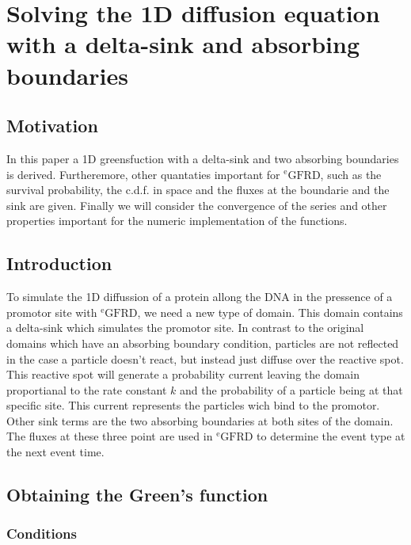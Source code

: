 \section{Solving the 1D diffusion equation with a delta-sink and absorbing boundaries}

\subsection{Motivation}

In this paper a 1D greensfuction with a delta-sink and two absorbing boundaries is derived. Furtheremore, other quantaties important for $^{\mathrm{e}} \mathrm{GFRD}$, such as the survival probability, the c.d.f. in space and the fluxes at the boundarie and the sink are given. Finally we will consider the convergence of the series and other properties important for the numeric implementation of the functions.

\subsection{Introduction}

To simulate the 1D diffussion of a protein allong the DNA in the pressence of a promotor site with $^{\mathrm{e}} \mathrm{GFRD}$, we need a new type of domain. This domain contains a delta-sink which simulates the promotor site. In contrast to the original domains which have an absorbing boundary condition, particles are not reflected in the case a particle doesn't react, but instead just diffuse over the reactive spot. This reactive spot will generate a probability current leaving the domain proportianal to the rate constant $k$ and the probability of a particle being at that specific site. This current represents the particles wich bind to the promotor. Other sink terms are the two absorbing boundaries at both sites of the domain. The fluxes at these three point are used in $^{\mathrm{e}} \mathrm{GFRD}$ to determine the event type at the next event time.

\subsection{Obtaining the Green's function}

\subsubsection{Conditions}

